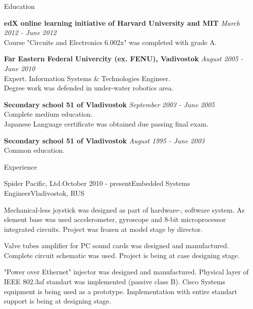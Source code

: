 \documentclass{resume}
\begin{document}

\begin{rSection}{Education}

{\bf edX online learning initiative of Harvard University and MIT} \hfill {\em March 2012 - June 2012} \\
Course "Circuits and Electronics 6.002x" was completed with grade A.

{\bf Far Eastern Federal Univercity (ex. FENU), Vadivostok} \hfill {\em August 2005 - June 2010} \\ 
Expert. Information Systems \& Technologies Engineer. \\
Degree work was defended in under-water robotics area.

{\bf Secondary school 51 of Vladivostok} \hfill {\em September 2003  - June 2005}\\
Complete medium education. \\
Japanese Language certificate was obtained due passing final exam.

{\bf Secondary school 51 of Vladivostok} \hfill {\em August 1995 - June 2003}\\
Common education.

\end{rSection}


\begin{rSection}{Experience}

\begin{rSubsection}{Spider Pacific, Ltd.}{October 2010 - present}{Embedded Systems Engineer}{Vladivostok, RUS}
\item Mechanical-less joystick was designed as part of hardware-, software system. As element base was used accelerometer, gyroscope and 8-bit 
microprocessor integrated circuits. Project was frozen at model stage by director.
\item Valve tubes amplifier for PC sound cards was designed and manufactured. Complete circuit schematic was 
used. Project is being at case designing stage.
\item "Power over Ethernet" injector was designed and manufactured. Physical layer of IEEE 802.3af standart was 
implemented (passive class B). Cisco Systems equipment is being used as a prototype. Implementation with entire 
standart support is being at designing stage.
\end{rSubsection}

\end{rSection}
\end{document}
